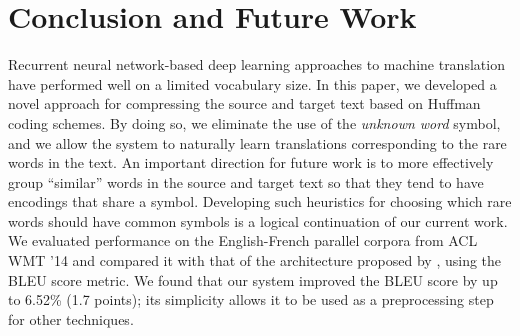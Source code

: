 \section{Conclusion and Future Work}
\label{sec:conclusion}

Recurrent neural network-based deep learning approaches
to machine translation have performed well on a limited vocabulary
size. In this paper, we developed a novel approach for compressing
the source and target text based on Huffman coding schemes. By doing
so, we eliminate the use of the \emph{unknown word} symbol,
and we allow the system to naturally learn translations corresponding
to the rare words in the text. An important direction for future work is to more effectively
group ``similar'' words in the source and target text so that they tend to have
encodings that share a symbol. Developing such heuristics for choosing which rare words should have common symbols
is a logical continuation of our current work. We evaluated performance on the English-French
parallel corpora from ACL WMT '14 and compared it with that of the architecture
proposed by , using the BLEU score metric.
We found that our system improved the BLEU score by up to 6.52\% (1.7 points); its simplicity
allows it to be used as a preprocessing step for other techniques.